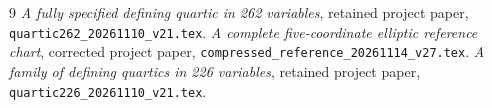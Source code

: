 \documentclass[11pt,a4paper]{article}
\begin{document}
\begin{thebibliography}{9}
 \emph{A fully specified defining quartic in 262 variables},
retained project paper, \nolinkurl{quartic262_20261110_v21.tex}.
 \emph{A complete five-coordinate elliptic reference chart},
corrected project paper, \nolinkurl{compressed_reference_20261114_v27.tex}.
 \emph{A family of defining quartics in 226 variables},
retained project paper, \nolinkurl{quartic226_20261110_v21.tex}.
\end{thebibliography}
\end{document}
